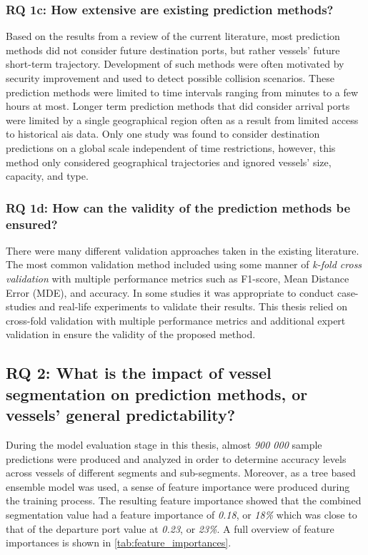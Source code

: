 \subsubsection{RQ 1c: How extensive are existing prediction methods?}

Based on the results from a review of the current literature, most prediction methods did not consider future destination ports, but rather vessels' future short-term trajectory. Development of such methods were often motivated by security improvement and used to detect possible collision scenarios. These prediction methods were limited to time intervals ranging from minutes to a few hours at most. Longer term prediction methods that did consider arrival ports were limited by a single geographical region often as a result from limited access to historical \acrshort{ais} data. Only one study was found to consider destination predictions on a global scale independent of time restrictions, however, this method only considered geographical trajectories and ignored vessels' size, capacity, and type.

\subsubsection{RQ 1d: How can the validity of the prediction methods be ensured?}

There were many different validation approaches taken in the existing literature. The most common validation method included using some manner of \textit{k-fold cross validation} with multiple performance metrics such as F1-score, Mean Distance Error (MDE), and accuracy. In some studies it was appropriate to conduct case-studies and real-life experiments to validate their results. This thesis relied on cross-fold validation with multiple performance metrics and additional expert validation in ensure the validity of the proposed method.

\subsection{RQ 2: What is the impact of vessel segmentation on prediction methods, or vessels' general predictability?}

During the model evaluation stage in this thesis, almost \textit{900 000} sample predictions were produced and analyzed in order to determine accuracy levels across vessels of different segments and sub-segments. Moreover, as a tree based ensemble model was used, a sense of feature importance were produced during the training process. The resulting feature importance showed that the combined segmentation value had a feature importance of \textit{0.18}, or \textit{18\%} which was close to that of the departure port value at \textit{0.23}, or \textit{23\%}. A full overview of feature importances is shown in \cref{tab:feature_importances}.

